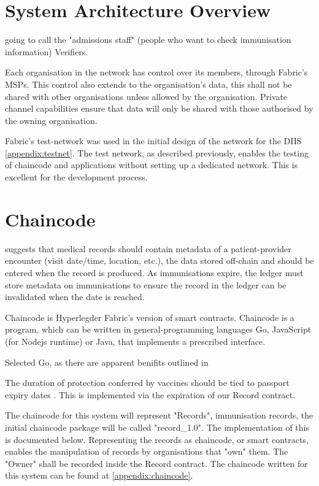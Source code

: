 \section{System Architecture Overview}

going to call the "admissions staff" (people who want to check immunisation information) Verifiers.

Each organisation in the network has control over its members, through Fabric's MSPs. 
This control also extends to the organisation's data, this shall not be shared with other organisations unless allowed by the organisation. 
Private channel capabilities ensure that data will only be shared with those authorised by the owning organisation. 

Fabric's test-network was used in the initial design of the network for the DIIS \ref{appendix:testnet}. The test network, as described previously, enables the testing of chaincode and applications without setting up a dedicated network. 
This is excellent for the development process. 

\section{}

\section{Chaincode}

\cite{alexaki_blockchain-based_2018} suggests that medical records should contain metadata of a patient-provider encounter (visit date/time, location, etc.), 
the data stored off-chain and should be entered when the record is produced. As immunisations expire, the ledger must store metadata on immunisations to ensure the record in the ledger can be invalidated when the date is reached.

Chaincode is Hyperlegder Fabric's version of smart contracts. Chaincode is a program, which can be written in general-programming languages Go, JavaScript (for Nodejs runtime) or Java, that implements a prescribed interface.

Selected Go, as there are apparent benifits outlined in \cite{foschini_hyperledger_2020}

The duration of protection conferred by vaccines should
be tied to passport expiry dates \cite{dye_covid-19_2021}.
This is implemented via the expiration of our Record contract.

The chaincode for this system will represent "Records", immunisation records, the initial chaincode package will be called "record\_1.0". The implementation of this is documented below. 
Representing the records as chaincode, or smart contracts, enables the manipulation of records by organisations that "own" them. The "Owner" shall be recorded inside the Record contract. 
The chaincode written for this system can be found at \ref{appendix:chaincode}.

